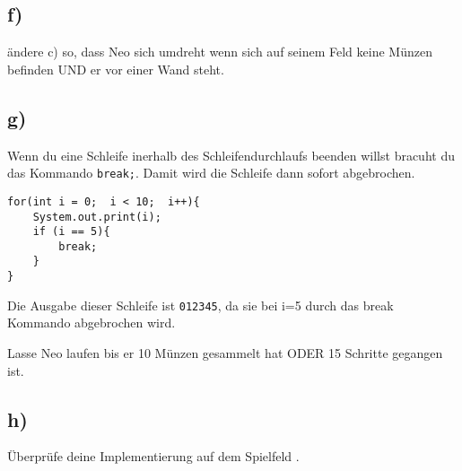 	\subsection*{f)}
	ändere c) so, dass Neo sich umdreht wenn sich auf seinem Feld keine Münzen befinden UND er vor einer Wand steht.

\subsection*{g)}
\begin{Infobox}[Break]
Wenn du eine Schleife inerhalb des Schleifendurchlaufs beenden willst bracuht du das Kommando  \lstinline{break;}. Damit wird die Schleife dann sofort abgebrochen.
\begin{lstlisting}
for(int i = 0;  i < 10;  i++){
	System.out.print(i);
	if (i == 5){
		break;
	}
}
\end{lstlisting}
Die Ausgabe dieser Schleife ist \lstinline{012345}, da sie bei i=5 durch das break Kommando abgebrochen wird.
\end{Infobox}
Lasse Neo laufen bis er 10 Münzen gesammelt hat ODER 15 Schritte gegangen ist.

\subsection*{h)}
Überprüfe deine Implementierung auf dem Spielfeld .
\newpage